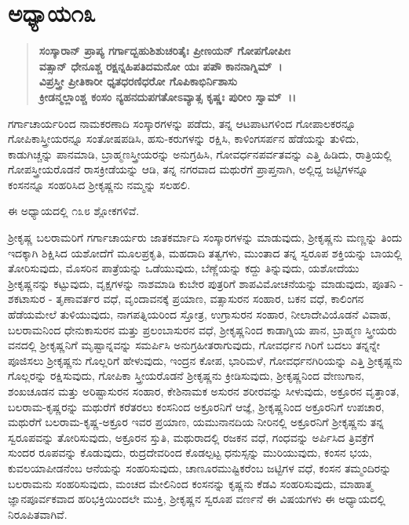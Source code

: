 \section*{ಅಧ್ಯಾಯ\enginline{-}೧೩}

\begin{verse}
\textbf{ಸಂಸ್ಕಾರಾನ್ ಪ್ರಾಪ್ಯ ಗರ್ಗಾದ್ಬಹುಶಿಶುಚರಿತೈಃ ಪ್ರೀಣಯನ್ ಗೋಪಗೋಪೀಃ} \\\textbf{ವತ್ಸಾನ್ ಧೇನೂಶ್ಚ ರಕ್ಷನ್ನಹಿಪತಿದಮನೋ ಯಃ ಪಪೌ ಕಾನನಾಗ್ನಿಮ್~।}\\\textbf{ವಿಪ್ರಸ್ತ್ರೀ ಪ್ರೀತಿಕಾರೀ ಧೃತಧರಣಿಧರೋ ಗೊಪಿಕಾಭಿರ್ನಿಶಾಸು} \\\textbf{ಕ್ರೀಡನ್ಮಲ್ಲಾಂಶ್ಚ ಕಂಸಂ ನ್ಯಹನದುಪಗತೋಽವ್ಯಾತ್ಸ ಕೃಷ್ಣಃ ಪುರೀಂ ಸ್ವಾಮ್~।।}
\end{verse}

ಗರ್ಗಾಚಾರ್ಯರಿಂದ ನಾಮಕರಣಾದಿ ಸಂಸ್ಕಾರಗಳನ್ನು ಪಡೆದು, ತನ್ನ ಆಟಪಾಟಗಳಿಂದ ಗೋಪಾಲಕರನ್ನೂ ಗೋಪಿಕಾಸ್ತ್ರೀಯರನ್ನೂ ಸಂತೋಷಪಡಿಸಿ, ಹಸು-ಕರುಗಳನ್ನು ರಕ್ಷಿಸಿ, ಕಾಳಿಂಗಸರ್ಪನ ಹೆಡೆಯನ್ನು ತುಳಿದು, ಕಾಡುಗಿಚ್ಚನ್ನು ಪಾನಮಾಡಿ, ಬ್ರಾಹ್ಮಣಸ್ತ್ರೀಯರನ್ನು ಅನುಗ್ರಹಿಸಿ, ಗೋವರ್ಧನಪರ್ವತವನ್ನು ಎತ್ತಿ ಹಿಡಿದು, ರಾತ್ರಿಯಲ್ಲಿ ಗೋಪಸ್ತ್ರೀಯರೊಡನೆ ರಾಸಕ್ರೀಡೆಯನ್ನು ಆಡಿ, ತನ್ನ ನಗರವಾದ ಮಥುರೆಗೆ ಪ್ರಾಪ್ತನಾಗಿ, ಅಲ್ಲಿದ್ದ ಜಟ್ಟಿಗಳನ್ನೂ ಕಂಸನನ್ನೂ ಸಂಹರಿಸಿದ ಶ‍್ರೀಕೃಷ್ಣನು ನಮ್ಮನ್ನು ಸಲಹಲಿ.

ಈ ಅಧ್ಯಾಯದಲ್ಲಿ ೧೩೮ ಶ್ಲೋಕಗಳಿವೆ.

ಶ‍್ರೀಕೃಷ್ಣ ಬಲರಾಮರಿಗೆ ಗರ್ಗಾಚಾರ್ಯರು ಜಾತಕರ್ಮಾದಿ ಸಂಸ್ಕಾರಗಳನ್ನು ಮಾಡು\-ವುದು, ಶ‍್ರೀಕೃಷ್ಣನು ಮಣ್ಣನ್ನು ತಿಂದು ಇದಕ್ಕಾಗಿ ಶಿಕ್ಷಿಸಿದ ಯಶೋದೆಗೆ ಮೂಲ\-ಪ್ರಕೃತಿ, ಮಹದಾದಿ ತತ್ವಗಳು, ಮುಂತಾದ ತನ್ನ ಸ್ವರೂಪ ಶಕ್ತಿಯನ್ನು ಬಾಯಲ್ಲಿ ತೋರಿಸುವುದು, ಮೊಸರಿನ ಪಾತ್ರೆಯನ್ನು ಒಡೆಯುವುದು, ಬೆಣ್ಣೆಯನ್ನು ಕದ್ದು ತಿನ್ನುವುದು, ಯಶೋದೆಯು ಶ‍್ರೀಕೃಷ್ಣನನ್ನು ಕಟ್ಟುವುದು, ವೃಕ್ಷಗಳನ್ನು ನಾಶಮಾಡಿ ಕುಬೇರ ಪುತ್ರರಿಗೆ ಶಾಪವಿಮೋಚನೆಯನ್ನು ಮಾಡುವುದು, ಪೂತನಿ - ಶಕಟಾಸುರ - ತೃಣಾವರ್ತರ ವಧೆ, ವೃಂದಾವನಕ್ಕೆ ಪ್ರಯಾಣ, ವತ್ಸಾಸುರನ ಸಂಹಾರ, ಬಕನ ವಧೆ, ಕಾಲಿಂಗನ ಹೆಡೆಯಮೇಲೆ ತುಳಿಯುವುದು, ನಾಗಪತ್ನಿಯರಿಂದ ಸ್ತೋತ್ರ, ಉಗ್ರಾಸುರನ ಸಂಹಾರ, ನೀಲಾದೇವಿಯೊಡನೆ ವಿವಾಹ, ಬಲರಾಮನಿಂದ ಧೇನುಕಾಸುರನ ಮತ್ತು ಪ್ರಲಂಬಾಸುರನ ವಧೆ, ಶ‍್ರೀಕೃಷ್ಣನಿಂದ ಕಾಡಾಗ್ನಿಯ ಪಾನ, ಬ್ರಾಹ್ಮಣ ಸ್ತ್ರೀಯರು ವನದಲ್ಲಿ ಶ‍್ರೀಕೃಷ್ಣನಿಗೆ ಮೃಷ್ಟಾನ್ನವನ್ನು ಸಮರ್ಪಿಸಿ ಅನುಗ್ರಹೀತ\-ರಾಗುವುದು, ಗೋವರ್ಧನ ಗಿರಿಗೆ ಬದಲು ತನ್ನನ್ನೇ ಪೂಜಿಸಲು ಶ‍್ರೀಕೃಷ್ಣನು ಗೊಲ್ಲರಿಗೆ ಹೇಳುವುದು, ಇಂದ್ರನ ಕೋಪ, ಭಾರಿಮಳೆ, ಗೋವರ್ಧನಗಿರಿಯನ್ನು ಎತ್ತಿ ಶ‍್ರೀಕೃಷ್ಣನು ಗೊಲ್ಲರನ್ನು ರಕ್ಷಿಸುವುದು, ಗೋಪಿಕಾ ಸ್ತ್ರೀಯರೊಡನೆ ಶ‍್ರೀಕೃಷ್ಣನು ಕ್ರೀಡಿಸುವುದು, ಶ‍್ರೀಕೃಷ್ಣನಿಂದ ವೇಣುಗಾನ, ಶಂಖಚೂಡನ ಮತ್ತು ಅರಿಷ್ಟಾಸುರನ ಸಂಹಾರ, ಕೇಶಿನಾಮಕ ಅಸುರನ ಶರೀರವನ್ನು ಸೀಳುವುದು, ಅಕ್ರೂರನ ವೃತ್ತಾಂತ, ಬಲರಾಮ-ಕೃಷ್ಣರನ್ನು ಮಥುರೆಗೆ ಕರೆತರಲು ಕಂಸನಿಂದ ಅಕ್ರೂರನಿಗೆ ಆಜ್ಞೆ, ಶ‍್ರೀಕೃಷ್ಣನಿಂದ ಅಕ್ರೂರನಿಗೆ ಉಪಚಾರ, ಮಥುರೆಗೆ ಬಲರಾಮ-ಕೃಷ್ಣ-ಅಕ್ರೂರ ಇವರ ಪ್ರಯಾಣ, ಯಮುನಾನದಿಯ ನೀರಿನಲ್ಲಿ ಅಕ್ರೂರನಿಗೆ ಶ‍್ರೀಕೃಷ್ಣನು ತನ್ನ ಸ್ವರೂಪವನ್ನು ತೋರಿಸುವುದು, ಅಕ್ರೂರನ ಸ್ತುತಿ, ಮಥುರಾದಲ್ಲಿ ರಜಕನ ವಧೆ, ಗಂಧವನ್ನು ಅರ್ಪಿಸಿದ ತ್ರಿವಕ್ರೆಗೆ ಸುಂದರ ರೂಪವನ್ನು ಕೊಡುವುದು, ರುದ್ರದೇವರಿಂದ ಕೊಡಲ್ಪಟ್ಟ ಧನುಸ್ಸನ್ನು ಮುರಿಯುವುದು, ಕಂಸನ ಭಯ, ಕುವಲಯಾಪೀಡನೆಂಬ ಆನೆಯನ್ನು ಸಂಹರಿಸುವುದು, ಚಾಣೂರಮುಷ್ಟಿಕರೆಂಬ ಜಟ್ಟಿಗಳ ವಧೆ, ಕಂಸನ ತಮ್ಮಂದಿರನ್ನು ಬಲರಾಮನು ಸಂಹರಿಸುವುದು, ಮಂಚದ ಮೇಲಿನಿಂದ ಕಂಸನನ್ನು ಕೃಷ್ಣನು ಕೆಡವಿ ಸಂಹರಿಸುವುದು, ಮಾಹಾತ್ಮ ಜ್ಞಾನಪೂರ್ವಕವಾದ ಹರಿಭಕ್ತಿಯಿಂದಲೇ ಮುಕ್ತಿ, ಶ‍್ರೀಕೃಷ್ಣನ ಸ್ವರೂಪ ವರ್ಣನೆ ಈ ವಿಷಯಗಳು ಈ ಅಧ್ಯಾಯದಲ್ಲಿ ನಿರೂಪಿತವಾಗಿವೆ.


